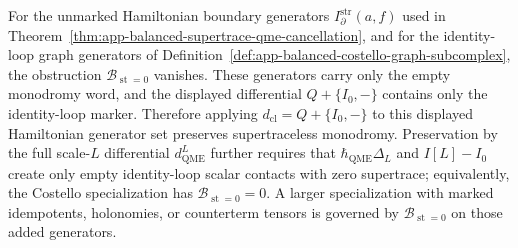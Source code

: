 \begin{thm}
  For the unmarked Hamiltonian boundary generators
  \(I^{\operatorname{str}}_\partial(a,f)\) used in
  Theorem~\ref{thm:app-balanced-supertrace-qme-cancellation}, and for the
  identity-loop graph generators of
  Definition~\ref{def:app-balanced-costello-graph-subcomplex}, the
  obstruction \(\mathcal B_{\operatorname{st}=0}\) vanishes.  These
  generators carry only the empty monodromy word, and the displayed
  differential \(Q+\{I_0,-\}\) contains only the identity-loop marker.
  Therefore applying
  \(d_{\mathrm{cl}}=Q+\{I_0,-\}\) to this displayed Hamiltonian
  generator set preserves supertraceless monodromy.  Preservation by the
  full scale-\(L\) differential \(d_{\mathrm{QME}}^{L}\) further requires
  that \(\hbar_{\mathrm{QME}}\Delta_L\) and \(I[L]-I_0\) create only empty
  identity-loop scalar contacts with zero supertrace; equivalently, the
  Costello specialization has \(\mathcal B_{\operatorname{st}=0}=0\).
  A larger specialization with marked idempotents, holonomies, or
  counterterm tensors is governed by
  \(\mathcal B_{\operatorname{st}=0}\) on those added generators.
\end{thm}

